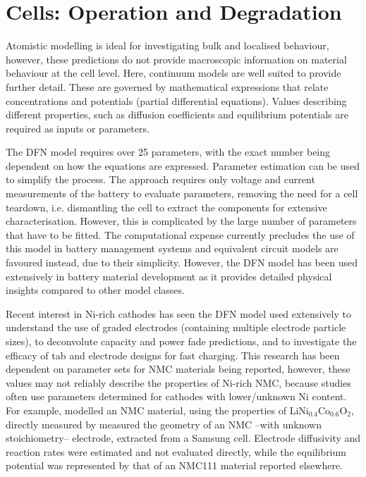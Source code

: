 \documentclass[journal=jacsat,manuscript=article]{achemso}
\begin{document}
\section*{Cells: Operation and Degradation}
Atomistic modelling is ideal for investigating bulk and localised behaviour, however, these predictions do not provide macroscopic information on material behaviour at the cell level. 
Here, continuum models are well suited to provide further detail. 
These are governed by mathematical expressions that relate concentrations and potentials (partial differential equations). 
Values describing different properties, such as diffusion coefficients and equilibrium potentials are required as inputs or parameters.

The DFN model requires over 25 parameters, with the exact number being dependent on how the equations are expressed.\cite{Kim2011} 
Parameter estimation can be used to simplify the process. 
The approach requires only voltage and current measurements of the battery to evaluate parameters, removing the need for a cell teardown, i.e. dismantling the cell to extract the components for extensive characterisation.\cite{Jin2018} 
However, this is complicated by the large number of parameters that have to be fitted.
The computational expense currently precludes the use of this model in battery management systems and equivalent circuit models are favoured instead, due to their simplicity.\cite{Marquis2019} 
However, the DFN model has been used extensively in battery material development as it provides detailed physical insights compared to other model classes.\cite{Dawson2018}

Recent interest in Ni-rich cathodes has seen the DFN model used extensively to understand the use of graded electrodes (containing multiple electrode particle sizes), to deconvolute capacity and power fade predictions, and to investigate the efficacy of tab and electrode designs for fast charging.\cite{Richardson2020,Kindermann2017,Sturm2019} 
This research has been dependent on parameter sets for NMC materials being reported, however, these values may not reliably describe the properties of Ni-rich NMC, because studies often use parameters determined for cathodes with lower/unknown Ni content. 
For example, \citeauthor{Richardson2020} modelled an NMC material, using the properties of LiNi$_{0.4}$Co$_{0.6}$O$_2$, directly measured by \citeauthor{Ecker2015}\cite{Richardson2020,Ecker2015} \citeauthor{Kindermann2017} measured the geometry of an NMC --with unknown stoichiometry-- electrode, extracted from a Samsung cell.\cite{Kindermann2017} 
Electrode diffusivity and reaction rates were estimated and not evaluated directly, while the equilibrium potential was represented by that of an NMC111 material reported elsewhere.\cite{Stewart_2008} 
\end{document}
